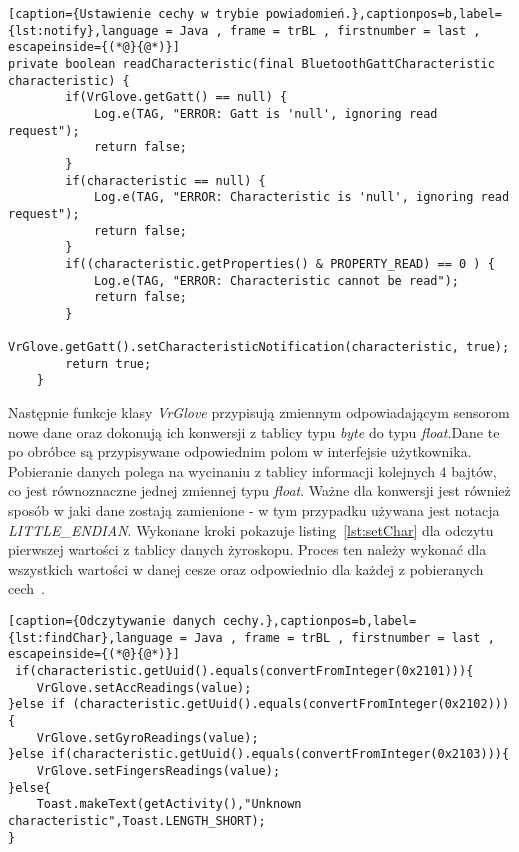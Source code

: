 \begin{lstlisting}[caption={Ustawienie cechy w trybie powiadomień.},captionpos=b,label={lst:notify},language = Java , frame = trBL , firstnumber = last , escapeinside={(*@}{@*)}]     
private boolean readCharacteristic(final BluetoothGattCharacteristic characteristic) {  
        if(VrGlove.getGatt() == null) {
            Log.e(TAG, "ERROR: Gatt is 'null', ignoring read request");
            return false;
        }
        if(characteristic == null) {
            Log.e(TAG, "ERROR: Characteristic is 'null', ignoring read request");
            return false;
        }
        if((characteristic.getProperties() & PROPERTY_READ) == 0 ) {
            Log.e(TAG, "ERROR: Characteristic cannot be read");
            return false;
        }
        VrGlove.getGatt().setCharacteristicNotification(characteristic, true);
        return true;
    }                                                      
\end{lstlisting}
Następnie funkcje klasy \textit{VrGlove} przypisują zmiennym odpowiadającym sensorom nowe dane oraz dokonują ich konwersji z tablicy typu \textit{byte} do typu \textit{float}.Dane te po obróbce są przypisywane odpowiednim polom w interfejsie użytkownika. Pobieranie danych polega na wycinaniu z tablicy informacji kolejnych 4 bajtów, co jest równoznaczne jednej zmiennej typu \textit{float}. Ważne dla konwersji jest również sposób w jaki dane zostają zamienione - w tym przypadku używana jest notacja \textit{LITTLE\_ENDIAN}. Wykonane kroki pokazuje listing~\ref{lst:setChar} dla odczytu pierwszej wartości z tablicy danych żyroskopu. Proces ten należy wykonać dla wszystkich wartości w danej cesze oraz odpowiednio dla każdej z pobieranych cech~\cite{AndroidDoc}.
\begin{lstlisting}[caption={Odczytywanie danych cechy.},captionpos=b,label={lst:findChar},language = Java , frame = trBL , firstnumber = last , escapeinside={(*@}{@*)}]     
 if(characteristic.getUuid().equals(convertFromInteger(0x2101))){
	VrGlove.setAccReadings(value);
}else if (characteristic.getUuid().equals(convertFromInteger(0x2102))){
	VrGlove.setGyroReadings(value);
}else if(characteristic.getUuid().equals(convertFromInteger(0x2103))){
	VrGlove.setFingersReadings(value);
}else{
	Toast.makeText(getActivity(),"Unknown characteristic",Toast.LENGTH_SHORT);
}                                                   
\end{lstlisting}

